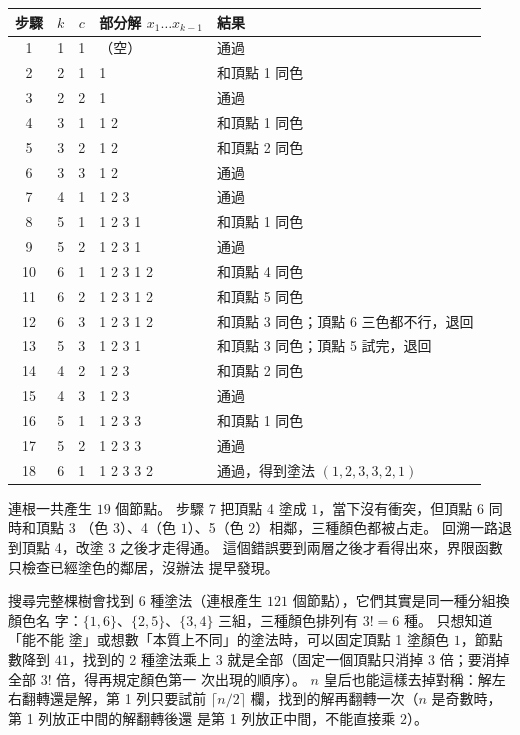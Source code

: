\begin{center}
\begin{tabular}{cccll}
\toprule
步驟 & $k$ & $c$ & 部分解 $x_1 \ldots x_{k-1}$ & 結果 \\
\midrule
1 & 1 & 1 & （空） & 通過 \\
2 & 2 & 1 & 1 & 和頂點 1 同色 \\
3 & 2 & 2 & 1 & 通過 \\
4 & 3 & 1 & 1 2 & 和頂點 1 同色 \\
5 & 3 & 2 & 1 2 & 和頂點 2 同色 \\
6 & 3 & 3 & 1 2 & 通過 \\
7 & 4 & 1 & 1 2 3 & 通過 \\
8 & 5 & 1 & 1 2 3 1 & 和頂點 1 同色 \\
9 & 5 & 2 & 1 2 3 1 & 通過 \\
10 & 6 & 1 & 1 2 3 1 2 & 和頂點 4 同色 \\
11 & 6 & 2 & 1 2 3 1 2 & 和頂點 5 同色 \\
12 & 6 & 3 & 1 2 3 1 2 & 和頂點 3 同色；頂點 6 三色都不行，退回 \\
13 & 5 & 3 & 1 2 3 1 & 和頂點 3 同色；頂點 5 試完，退回 \\
14 & 4 & 2 & 1 2 3 & 和頂點 2 同色 \\
15 & 4 & 3 & 1 2 3 & 通過 \\
16 & 5 & 1 & 1 2 3 3 & 和頂點 1 同色 \\
17 & 5 & 2 & 1 2 3 3 & 通過 \\
18 & 6 & 1 & 1 2 3 3 2 & 通過，得到塗法 $(1, 2, 3, 3, 2, 1)$ \\
\bottomrule
\end{tabular}
\end{center}

連根一共產生 $19$ 個節點。 步驟 7 把頂點 4 塗成 $1$，當下沒有衝突，但頂點 6 同時和頂點 3
（色 $3$）、4（色 $1$）、5（色 $2$）相鄰，三種顏色都被占走。 回溯一路退到頂點 4，改塗
$3$ 之後才走得通。 這個錯誤要到兩層之後才看得出來，界限函數只檢查已經塗色的鄰居，沒辦法
提早發現。

搜尋完整棵樹會找到 $6$ 種塗法（連根產生 $121$ 個節點），它們其實是同一種分組換顏色名
字：$\{1, 6\}$、$\{2, 5\}$、$\{3, 4\}$ 三組，三種顏色排列有 $3! = 6$ 種。 只想知道「能不能
塗」或想數「本質上不同」的塗法時，可以固定頂點 1 塗顏色 $1$，節點數降到 $41$，找到的 $2$
種塗法乘上 $3$ 就是全部（固定一個頂點只消掉 $3$ 倍；要消掉全部 $3!$ 倍，得再規定顏色第一
次出現的順序）。 $n$ 皇后也能這樣去掉對稱：解左右翻轉還是解，第 1 列只要試前
$\lceil n / 2 \rceil$ 欄，找到的解再翻轉一次（$n$ 是奇數時，第 1 列放正中間的解翻轉後還
是第 1 列放正中間，不能直接乘 $2$）。

